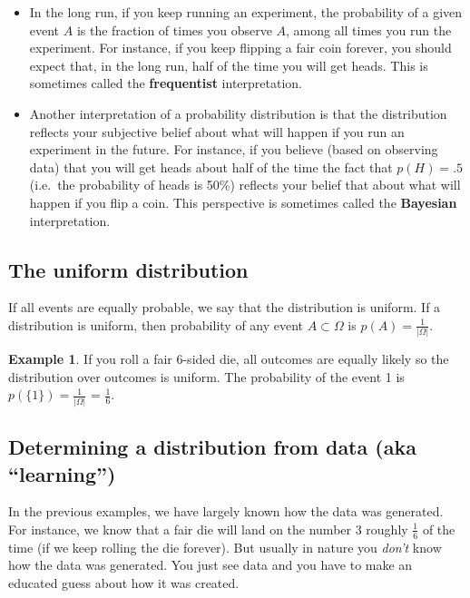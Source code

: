 \documentclass[]{article}
\theoremstyle{definition}
\newtheorem{exmp}{Example}[section]
\begin{document}
\begin{itemize}
\item In the long run, if you keep running an experiment, the probability of a given event $A$ is the fraction of times you observe $A$, among all times you run the experiment. For instance, if you keep flipping a fair coin forever, you should expect that, in the long run, half of the time you will get heads. This is sometimes called the \textbf{frequentist} interpretation. 
\item Another interpretation of a probability distribution is that the distribution reflects your subjective belief about what will happen if you run an experiment in the future. For instance, if you believe (based on observing data) that you will get heads about half of the time the fact that $p(H)=.5$ (i.e.\ the probability of heads is 50\%) reflects your belief that about what will happen if you flip a coin. This perspective is sometimes called the \textbf{Bayesian} interpretation.
\end{itemize}

\subsection{The uniform distribution}

If all events are equally probable, we say that the distribution is uniform. If a distribution is uniform, then probability of any event $A \subset \Omega$ is $p(A)=\frac{1}{\vert \Omega \vert}$.

\begin{exmp}
If you roll a fair 6-sided die, all outcomes are equally likely so the distribution over outcomes is uniform. The probability of the event 1 is $p(\{1\})=\frac{1}{\vert \Omega \vert}$ = $\frac{1}{6}$.
\end{exmp}

\subsection{Determining a distribution from data (aka ``learning'')}\label{s:learning}

In the previous examples, we have largely known how the data was generated. For instance, we know that a fair die will land on the number 3 roughly $\frac{1}{6}$ of the time (if we keep rolling the die forever). But usually in nature you \textit{don't} know how the data was generated. You just see data and you have to make an educated guess about how it was created. 
\end{document}
